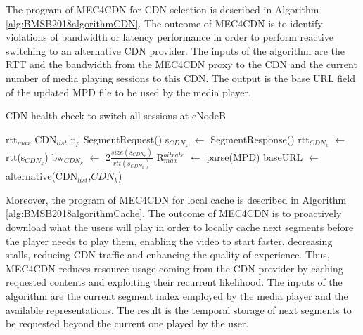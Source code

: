 The program of MEC4CDN for CDN selection is described in Algorithm \ref{alg:BMSB2018algorithmCDN}. The outcome of MEC4CDN is to identify violations of bandwidth or latency performance in order to perform reactive switching to an alternative CDN provider. The inputs of the algorithm are the RTT and the bandwidth from the MEC4CDN proxy to the CDN and the current number of media playing sessions to this CDN. The output is the base URL field of the updated MPD file to be used by the media player.

\begin{algorithm}
	\renewcommand{\algorithmicrequire}{\textbf{Input:}}
	\renewcommand{\algorithmicensure}{\textbf{Output:}}
	\caption{CDN health check to switch all sessions at eNodeB}
	\label{alg:BMSB2018algorithmCDN}
	\begin{algorithmic}
		
		 
		\State rtt$_{max}$ 
		\State CDN$_{list}$ 
		\State n$_{p}$ 
		 
		\State SegmentRequest() 
		\State s$_{CDN_\textit{k}}$ $\leftarrow$ SegmentResponse() 
		\State rtt$_{CDN_\textit{k}}$ $\leftarrow$ rtt(s$_{CDN_\textit{k}}$) 
		\State bw$_{CDN_\textit{k}}$ $\leftarrow$ 2$\frac{size(s_{CDN_\textit{k}})}{rtt(s_{CDN_\textit{k}})}$ 
		\State R$_{max}^{bitrate}$ $\leftarrow$ parse(MPD) 
		\State {}
		\State baseURL $\leftarrow$ alternative(CDN$_{list}$,$CDN_{k}$)
		\State {}
		\EndIf
		\EndFor
		\EndProcedure
	\end{algorithmic}
\end{algorithm}

Moreover, the program of MEC4CDN for local cache is described in Algorithm \ref{alg:BMSB2018algorithmCache}. The outcome of MEC4CDN is to proactively download what the users will play in order to locally cache next segments before the player needs to play them, enabling the video to start faster, decreasing stalls, reducing CDN traffic and enhancing the quality of experience. Thus, MEC4CDN reduces resource usage coming from the CDN provider by caching requested contents and exploiting their recurrent likelihood. The inputs of the algorithm are the current segment index employed by the media player and the available representations. The result is the temporal storage of next segments to be requested beyond the current one played by the user.


